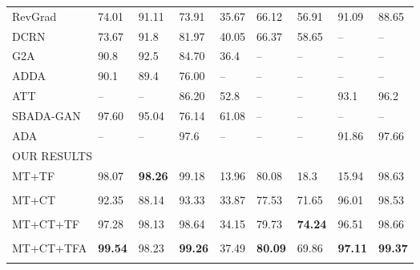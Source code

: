 \documentclass{article}
\begin{document}
\begin{table}[!t]
\begin{center}
\begin{threeparttable}
\begin{tabular}{lllllllll}
\hline

RevGrad\tnote{a}~~\tnote{[1]}    &
        74.01 &        91.11 &         73.91 &        35.67 &       66.12 &       56.91 &             91.09 &             88.65 \\
DCRN~\tnote{[2]}       &
        73.67 &         91.8 &         81.97 &        40.05 &       66.37 &       58.65 &                -- &                -- \\
G2A~\tnote{[3]}        &
         90.8 &         92.5 &         84.70 &         36.4 &          -- &          -- &                -- &                -- \\
ADDA~\tnote{[4]}       &
         90.1 &         89.4 &         76.00 &           -- &          -- &          -- &                -- &                -- \\
ATT~\tnote{[5]}        &
           -- &           -- &         86.20 &         52.8 &          -- &          -- &              93.1 &              96.2 \\
SBADA-GAN~\tnote{[6]}        &
        97.60 &        95.04 &         76.14 &        61.08 &          -- &          -- &                -- &                -- \\
ADA~\tnote{[7]}        &
           -- &           -- &          97.6 &           -- &          -- &          -- &             91.86 &             97.66 \\
\hline
\multicolumn{9}{l}{OUR RESULTS} \\
\rule{0pt}{2.5ex}MT+TF      &
        98.07 & \textbf{98.26} &       99.18 & 13.96\tnote{c} &     80.08 &        18.3 &             15.94 &             98.63 \\
 &  &    &     &    &   &   &          &         \\

MT+CT\tnote{*}      &
        92.35 &        88.14 &         93.33 & 33.87\tnote{c} &     77.53 &       71.65 &             96.01 &             98.53 \\
 &  &    &     &    &   &   &         &         \\

MT+CT+TF      &
        97.28 &        98.13 &         98.64 & 34.15\tnote{c} &     79.73 & \textbf{74.24} &          96.51 &             98.66 \\
 &  &    &     &    &   &   &         &         \\

MT+CT+TFA  &
\textbf{99.54} &       98.23 &\textbf{99.26} & 37.49\tnote{c} & \textbf{80.09} & 69.86  &    \textbf{97.11} &    \textbf{99.37} \\
 &  &    &     &     &  &   &         &         \\


\end{tabular}
\end{threeparttable}
\end{center}
\end{table}
\end{document}
